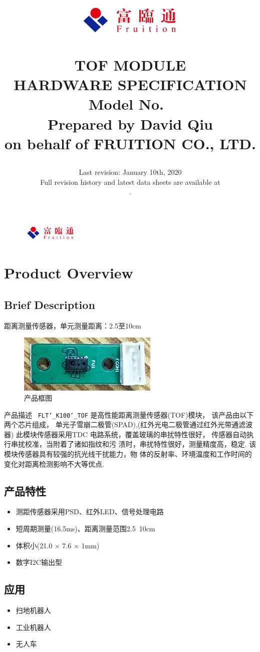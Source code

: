\documentclass{scrreprt}
\title{
	\begin{figure}[H]
		\centering\includegraphics[width=0.5\textwidth]{logo.jpeg}
	\end{figure}
	\vspace{1cm}
	\flushright
	\Huge{TOF MODULE}\\
	\Huge{HARDWARE SPECIFICATION}\\
	\vspace{2cm}
	\huge{Model No.\ \modelno}\\
	\vspace{2cm}
	\LARGE{Prepared by David Qiu \\ on behalf of FRUITION CO., LTD.}
}
\date{
	Last revision: January 10th, 2020\\
	\vspace{0.5cm}
	Full revision history and latest data sheets are available at\\
	\vspace{0.25cm}
	\upstream.
}
\newcommand{\pchapter}[1]{
	\begingroup\let\clearpage\relax
	\newpage
	\begin{figure}[H]
		\includegraphics[width=0.25\textwidth]{logo.jpeg}
	\end{figure}
	\chapter{#1}
	\endgroup
}
\newcommand{\modelno}{
	\texttt{FLT\char`_K100\char`_TOF}
}
\newcommand{\x}{
	$\times$
}
\begin{document}
\begin{CJK*}{UTF8}{gbsn}
\maketitle
\tableofcontents

\pchapter{Product Overview}
\section{Brief Description}
距离测量传感器，单元测量距离：2.5至10cm

\begin{figure}[H]
\center\includegraphics{tof-picture.png}
\caption{产品框图}
\end{figure}

产品描述\ \modelno 是高性能距离测量传感器(TOF)模块， 该产品由以下两个芯片组成，
单光子雪崩二极管(SPAD),(红外光电二极管通过红外光带通滤波器) 此模块传感器采用TDC
电路系统，覆盖玻璃的串扰特性很好， 传感器自动执行串扰校准，当附着了诸如指纹和污
渍时，串扰特性很好，测量精度高，稳定.  该模块传感器具有较强的抗光线干扰能力，物
体的反射率、环境温度和工作时间的变化对距离检测影响不大等优点.

\section{产品特性}
\begin{itemize}
	\item 测距传感器采用PSD、红外LED、信号处理电路
	\item 短周期测量(16.5ms)、距离测量范围2.5~10cm
	\item 体积小(21.0\x7.6\x1mm)
	\item 数字I2C输出型
\end{itemize}

\section{应用}
\begin{itemize}
	\item 扫地机器人
	\item 工业机器人
	\item 无人车
\end{itemize}


\end{CJK*}
\end{document}
